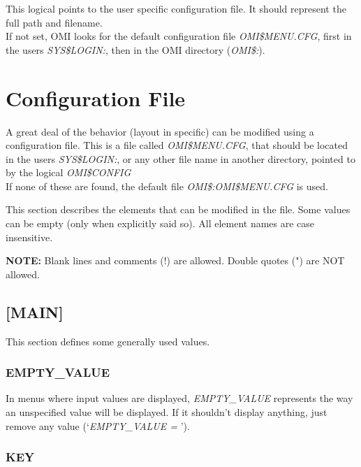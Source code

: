 \documentclass[a4paper]{book}
\newcommand{\vs}{\vspace{3mm}}
\begin{document}
This logical points to the user specific configuration file. It should 
represent the full path and filename. \\
If not set, OMI looks for the default configuration file \textsl{OMI{\$}MENU.CFG}, 
first in the users \textsl{SYS{\$}LOGIN:}, then in the OMI directory (\textsl{OMI{\$}:}).

\section{Configuration File}
\label{subsec:configuration}

A great deal of the behavior (layout in specific) can be modified using a 
configuration file. This is a file called \textsl{OMI{\$}MENU.CFG}, that should be 
located in the users \textsl{SYS{\$}LOGIN:}, or any other file name in another 
directory, pointed to by the logical \textsl{OMI{\$}CONFIG} \\
If none of these are found, the default file \textsl{OMI{\$}:OMI{\$}MENU.CFG} is 
used.

\vs

This section describes the elements that can be modified in the file. Some 
values can be empty (only when explicitly said so). All element names are 
case insensitive.

\vs

\hspace{-8mm}\textbf{NOTE:} Blank lines and comments (!) are allowed. Double quotes (") 
are NOT allowed.

\subsection{[MAIN]}
\label{subsubsec:mylabel16}

This section defines some generally used values.

\subsubsection{EMPTY{\_}VALUE}

In menus where input values are displayed, \linebreak\textsl{EMPTY{\_}VALUE} represents the 
way an unspecified value will be displayed. If it shouldn't display 
anything, just remove any value (`\textsl{EMPTY{\_}VALUE =} ').

\subsubsection{KEY}
\end{document}
